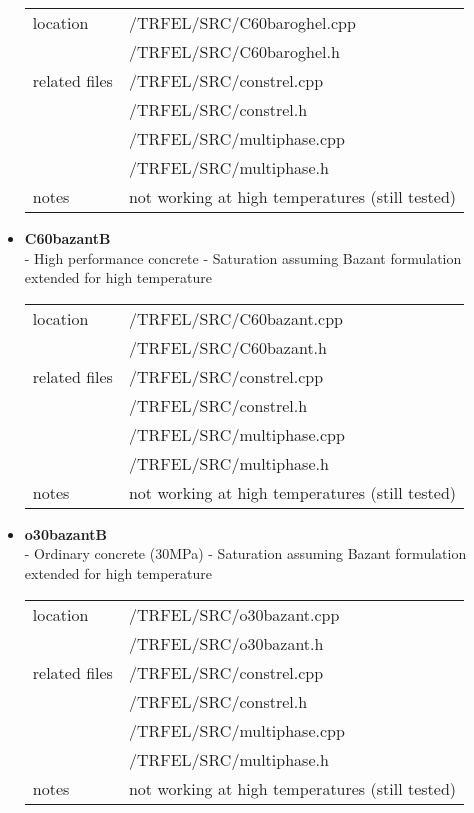 \begin{itemize}
\begin{center}
\begin{tabular}{|l|l|}
\hline
location & /TRFEL/SRC/C60baroghel.cpp\\
         & /TRFEL/SRC/C60baroghel.h
\\ \hline
related files & /TRFEL/SRC/constrel.cpp\\
              & /TRFEL/SRC/constrel.h\\
              & /TRFEL/SRC/multiphase.cpp\\
              & /TRFEL/SRC/multiphase.h
\\ \hline
notes & not working at high temperatures (still tested) 
\\ \hline
\end{tabular}
\end{center}

\item{\bf C60bazantB}\\
 - High performance concrete - Saturation assuming Bazant formulation extended for high temperature

\begin{center}
\begin{tabular}{|l|l|}
\hline
location & /TRFEL/SRC/C60bazant.cpp\\
         & /TRFEL/SRC/C60bazant.h
\\ \hline
related files & /TRFEL/SRC/constrel.cpp\\
              & /TRFEL/SRC/constrel.h\\
              & /TRFEL/SRC/multiphase.cpp\\
              & /TRFEL/SRC/multiphase.h
\\ \hline
notes & not working at high temperatures (still tested) 
\\ \hline
\end{tabular}
\end{center}

\item{\bf o30bazantB}\\
 - Ordinary concrete (30MPa) - Saturation assuming Bazant formulation extended for high temperature

\begin{center}
\begin{tabular}{|l|l|}
\hline
location & /TRFEL/SRC/o30bazant.cpp\\
         & /TRFEL/SRC/o30bazant.h
\\ \hline
related files & /TRFEL/SRC/constrel.cpp\\
              & /TRFEL/SRC/constrel.h\\
              & /TRFEL/SRC/multiphase.cpp\\
              & /TRFEL/SRC/multiphase.h
\\ \hline
notes & not working at high temperatures (still tested) 
\\ \hline
\end{tabular}
\end{center}

\end{itemize}
